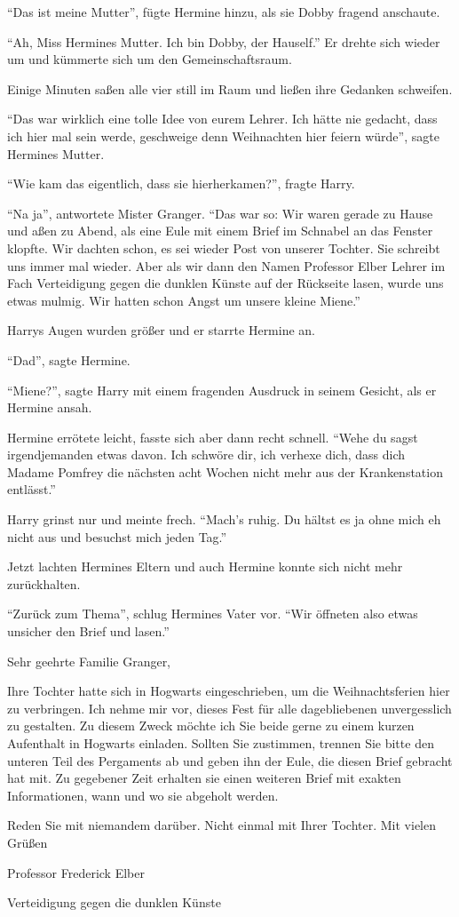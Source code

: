 \enquote{Das ist meine Mutter}, fügte Hermine hinzu, als sie Dobby fragend anschaute.

\enquote{Ah, Miss Hermines Mutter. Ich bin Dobby, der Hauself.} Er drehte sich wieder um und kümmerte sich um den Gemeinschaftsraum.

Einige Minuten saßen alle vier still im Raum und ließen ihre Gedanken schweifen.

\enquote{Das war wirklich eine tolle Idee von eurem Lehrer. Ich hätte nie gedacht, dass ich hier mal sein werde, geschweige denn Weihnachten hier feiern würde}, sagte Hermines Mutter.

\enquote{Wie kam das eigentlich, dass sie hierherkamen?}, fragte Harry.

\enquote{Na ja}, antwortete Mister Granger. \enquote{Das war so: Wir waren gerade zu Hause und aßen zu Abend, als eine Eule mit einem Brief im Schnabel an das Fenster klopfte. Wir dachten schon, es sei wieder Post von unserer Tochter. Sie schreibt uns immer mal wieder. Aber als wir dann den Namen Professor Elber \gst Lehrer im Fach Verteidigung gegen die dunklen Künste \gst auf der Rückseite lasen, wurde uns etwas mulmig. Wir hatten schon Angst um unsere kleine Miene.}

Harrys Augen wurden größer und er starrte Hermine an.

\enquote{Dad}, sagte Hermine.

\enquote{Miene?}, sagte Harry mit einem fragenden Ausdruck in seinem Gesicht, als er Hermine ansah.

Hermine errötete leicht, fasste sich aber dann recht schnell. \enquote{Wehe du sagst irgendjemanden etwas davon. Ich schwöre dir, ich verhexe dich, dass dich Madame Pomfrey die nächsten acht Wochen nicht mehr aus der Krankenstation entlässt.}

Harry grinst nur und meinte frech. \enquote{Mach’s ruhig. Du hältst es ja ohne mich eh nicht aus und besuchst mich jeden Tag.}

Jetzt lachten Hermines Eltern und auch Hermine konnte sich nicht mehr zurückhalten.

\enquote{Zurück zum Thema}, schlug Hermines Vater vor. \enquote{Wir öffneten also etwas unsicher den Brief und lasen.}

\begin{brief}
Sehr geehrte Familie Granger,

Ihre Tochter hatte sich in Hogwarts eingeschrieben, um die Weihnachtsferien hier zu verbringen. Ich nehme mir vor, dieses Fest für alle dagebliebenen unvergesslich zu gestalten. Zu diesem Zweck möchte ich Sie beide gerne zu einem kurzen Aufenthalt in Hogwarts einladen. Sollten Sie zustimmen, trennen Sie bitte den unteren Teil des Pergaments ab und geben ihn der Eule, die diesen Brief gebracht hat mit. Zu gegebener Zeit erhalten sie einen weiteren Brief mit exakten Informationen, wann und wo sie abgeholt werden.

Reden Sie mit niemandem darüber. Nicht einmal mit Ihrer Tochter.
\signumspace
Mit vielen Grüßen

Professor Frederick Elber

Verteidigung gegen die dunklen Künste
\end{brief}

